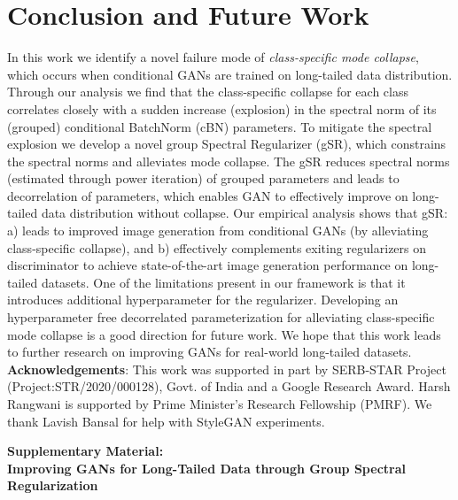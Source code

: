 \documentclass[runningheads,table]{llncs}
\begin{document}
\section{Conclusion and Future Work}
In this work we identify a novel failure mode of \textit{class-specific mode collapse}, which occurs when conditional GANs are trained on long-tailed data distribution. Through our analysis we find that the class-specific collapse for each class correlates closely with a sudden increase (explosion) in the spectral norm of its (grouped) conditional BatchNorm  (cBN) parameters. To mitigate the spectral explosion we develop a novel group Spectral Regularizer (gSR), which constrains the spectral norms and alleviates mode collapse. The gSR reduces spectral norms (estimated through power iteration) of grouped parameters and leads to decorrelation of parameters, which enables GAN to effectively improve on long-tailed data distribution without collapse. Our empirical analysis shows that gSR:  a) leads to improved image generation from conditional GANs (by alleviating class-specific collapse), and b) effectively complements exiting regularizers on discriminator to achieve state-of-the-art image generation performance on long-tailed datasets. One of the limitations present in our framework is that it introduces additional hyperparameter  for the regularizer. Developing an hyperparameter free decorrelated parameterization for alleviating class-specific mode collapse is a good direction for future work. We hope that this work leads to further research on improving GANs for real-world long-tailed datasets. \\
\textbf{Acknowledgements}: This work was supported in part by  SERB-STAR Project (Project:STR/2020/000128), Govt. of India and a Google Research Award. Harsh Rangwani is supported by Prime Minister's Research Fellowship (PMRF). We thank Lavish Bansal for help with StyleGAN experiments. 



\clearpage

\appendix

\renewcommand \thepart{}
\renewcommand \partname{}

\noindent
\begin{center}
\textbf{\Large Supplementary Material: \\ Improving GANs for Long-Tailed Data through Group Spectral Regularization} 
\end{center}
\renewcommand{\labelitemii}{}
\end{document}
